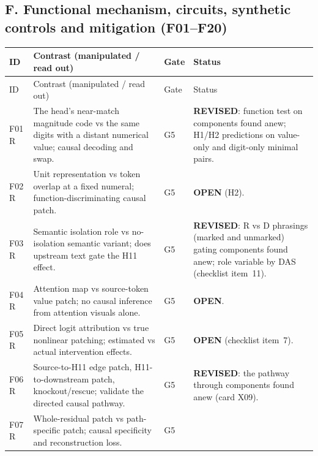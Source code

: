 \documentclass[10pt,a4paper]{article}
\begin{document}
\endgroup

\subsection{F. Functional mechanism, circuits, synthetic controls and mitigation (F01--F20)}
\label{sec:inv-F}

\begingroup\small
\begin{longtable}{@{}P{1.2cm}P{7.2cm}P{1.3cm}P{5.6cm}@{}}
\toprule
ID & Contrast (manipulated / read out) & Gate & Status \\
\midrule
\endfirsthead
\toprule
ID & Contrast (manipulated / read out) & Gate & Status \\
\midrule
\endhead
\bottomrule
\endfoot
F01 \newline R & The head's near-match magnitude code vs the same digits with a distant numerical value; causal decoding and swap. & G5 &
\textbf{REVISED}: function test on components found anew; H1/H2 predictions on value-only and digit-only minimal pairs. \\
F02 \newline R & Unit representation vs token overlap at a fixed numeral; function-discriminating causal patch. & G5 &
\textbf{OPEN} (H2). \\
F03 \newline R & Semantic isolation role vs no-isolation semantic variant; does upstream text gate the H11 effect. & G5 &
\textbf{REVISED}: R vs D phrasings (marked and unmarked) gating components found anew; role variable by DAS (checklist item~11). \\
F04 \newline R & Attention map vs source-token value patch; no causal inference from attention visuals alone. & G5 &
\textbf{OPEN}. \\
F05 \newline R & Direct logit attribution vs true nonlinear patching; estimated vs actual intervention effects. & G5 &
\textbf{OPEN} (checklist item~7). \\
F06 \newline R & Source-to-H11 edge patch, H11-to-downstream patch, knockout/rescue; validate the directed causal pathway. & G5 &
\textbf{REVISED}: the pathway through components found anew (card X09). \\
F07 \newline R & Whole-residual patch vs path-specific patch; causal specificity and reconstruction loss. & G5 &

\end{longtable}
\end{document}
